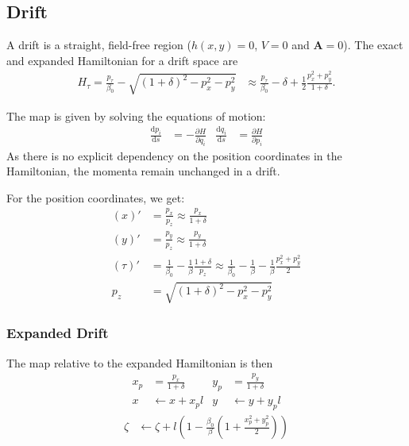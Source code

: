 \subsection{Drift}
A drift is a straight, field-free region ($h(x,y)=0$, $V=0$ and
$\mathbf{A}=0$).  The exact and expanded Hamiltonian for a drift space are
\begin{align}
  H_\tau =
    \frac{p_\tau}{\beta_0}  - \sqrt{(1+\delta)^2 - p_x^2 - p_y^2}
  &\approx
    \frac{p_\tau}{\beta_0} - \delta + \frac{1}{2}\frac{p_x^2+p_y^2}{1+\delta}.
\end{align}

The map is given by solving the equations of motion:
\begin{align}
  \frac{\text{d} p_i}{\text{d}s} &= -\frac{\partial H}{\partial q_i} &
  \frac{\text{d} q_i}{\text{d}s} &=  \frac{\partial H}{\partial p_i} 
\end{align}
As there is no explicit dependency on the position coordinates in the Hamiltonian, the
momenta remain unchanged in a drift.

For the position coordinates, we get:
\begin{align}
  \left(x\right)' &=
        \frac{p_x}{p_z}
        \approx \frac{p_x}{1+\delta} \\
  \left(y\right)' &=
        \frac{p_y}{p_z}
        \approx \frac{p_y}{1+\delta} \\
  \left(\tau\right)' &=
        \frac{1}{\beta_0} - \frac{1}{\beta}\frac{1+\delta}{p_z}
        \approx \frac{1}{\beta_0} - \frac{1}{\beta} - \frac{1}{\beta}
                \frac{p_x^2 + p_y^2}{2} \\
  p_z &=
        \sqrt{(1+\delta)^2 - p_x^2 - p_y^2}
\end{align}



\subsubsection{Expanded Drift}

The map relative to the expanded Hamiltonian is then
\begin{align}
  x_p &= \frac{p_x}{1+\delta} & 
  y_p &= \frac{p_y}{1+\delta}  \\
  x & \leftarrow x + x_p l &
  y & \leftarrow y + y_p l
\end{align}
\begin{align}
  \zeta &
    \leftarrow \zeta+
    l\left(1- \frac{\beta_0}{\beta}\left(1 + \frac{x_p^2+y_p^2}{2}\right)\right)
\end{align}

